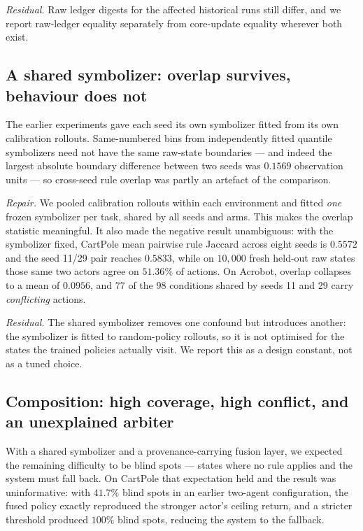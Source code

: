 \documentclass[11pt,a4paper]{article}
\begin{document}
\emph{Residual.} Raw ledger digests for the affected historical runs still differ, and we report raw-ledger equality separately from core-update equality wherever both exist.

\subsection{A shared symbolizer: overlap survives, behaviour does not}
\label{sec:hist-shared}

The earlier experiments gave each seed its own symbolizer fitted from its own calibration rollouts. Same-numbered bins from independently fitted quantile symbolizers need not have the same raw-state boundaries --- and indeed the largest absolute boundary difference between two seeds was $0.1569$ observation units --- so cross-seed rule overlap was partly an artefact of the comparison.

\emph{Repair.} We pooled calibration rollouts within each environment and fitted \emph{one} frozen symbolizer per task, shared by all seeds and arms. This makes the overlap statistic meaningful. It also made the negative result unambiguous: with the symbolizer fixed, CartPole mean pairwise rule Jaccard across eight seeds is $0.5572$ and the seed 11/29 pair reaches $0.5833$, while on $10{,}000$ fresh held-out raw states those same two actors agree on $51.36\%$ of actions. On Acrobot, overlap collapses to a mean of $0.0956$, and $77$ of the $98$ conditions shared by seeds 11 and 29 carry \emph{conflicting} actions.

\emph{Residual.} The shared symbolizer removes one confound but introduces another: the symbolizer is fitted to random-policy rollouts, so it is not optimised for the states the trained policies actually visit. We report this as a design constant, not as a tuned choice.

\subsection{Composition: high coverage, high conflict, and an unexplained arbiter}
\label{sec:hist-arbiter}

With a shared symbolizer and a provenance-carrying fusion layer, we expected the remaining difficulty to be blind spots --- states where no rule applies and the system must fall back. On CartPole that expectation held and the result was uninformative: with $41.7\%$ blind spots in an earlier two-agent configuration, the fused policy exactly reproduced the stronger actor's ceiling return, and a stricter threshold produced $100\%$ blind spots, reducing the system to the fallback.
\end{document}
